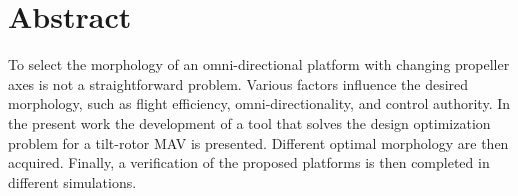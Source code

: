 \chapter*{Abstract}
To select the morphology of an omni-directional platform with changing propeller
axes is not a straightforward problem. Various factors influence the desired
morphology, such as flight efficiency, omni-directionality, and control authority.
In the present work the development of a tool that solves the design optimization
problem for a tilt-rotor MAV is presented. Different optimal morphology are
then acquired. Finally, a verification of the proposed platforms is then completed
in different simulations.
